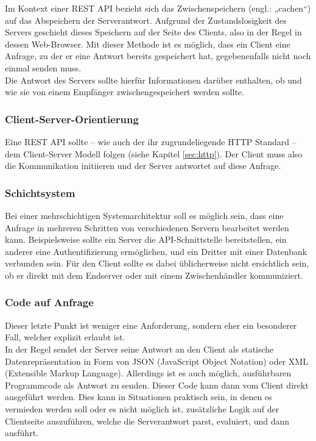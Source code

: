 Im Kontext einer REST API bezieht sich das Zwischenspeichern (engl.: „cachen“) auf das Abspeichern der Serverantwort. Aufgrund der Zustandslosigkeit des Servers geschieht dieses Speichern auf der Seite des Clients, also in der Regel in dessen Web-Browser. Mit dieser Methode ist es möglich, dass ein Client eine Anfrage, zu der er eine Antwort bereits gespeichert hat, gegebenenfalls nicht noch einmal senden muss.\\
Die Antwort des Servers sollte hierfür Informationen darüber enthalten, ob und wie sie von einem Empfänger zwischengespeichert werden sollte.

\subsubsection*{Client-Server-Orientierung}
\label{subsubsec:rest_clientserverorientierung}

Eine REST API sollte – wie auch der ihr zugrundeliegende HTTP Standard – dem Client-Server Modell folgen (siehe Kapitel \ref{sec:http}). Der Client muss also die Kommunikation initiieren und der Server antwortet auf diese Anfrage.

\subsubsection*{Schichtsystem}
\label{subsubsec:rest_schichtsystem}

Bei einer mehrschichtigen Systemarchitektur soll es möglich sein, dass eine Anfrage in mehreren Schritten von verschiedenen Servern bearbeitet werden kann. Beispielsweise sollte ein Server die API-Schnittstelle bereitstellen, ein anderer eine Authentifizierung ermöglichen, und ein Dritter mit einer Datenbank verbunden sein. Für den Client sollte es dabei üblicherweise nicht ersichtlich sein, ob er direkt mit dem Endserver oder mit einem Zwischenhändler kommuniziert.

\subsubsection*{Code auf Anfrage}
\label{subsubsec:rest_codeaufanfrage}

Dieser letzte Punkt ist weniger eine Anforderung, sondern eher ein besonderer Fall, welcher explizit erlaubt ist.\\
In der Regel sendet der Server seine Antwort an den Client als statische Datenrepräsentation in Form von JSON (JavaScript Object Notation) oder XML (Extensible Markup Language). Allerdings ist es auch möglich, ausführbaren Programmcode als Antwort zu senden. Dieser Code kann dann vom Client direkt ausgeführt werden. Dies kann in Situationen praktisch sein, in denen es vermieden werden soll oder es nicht möglich ist, zusätzliche Logik auf der Clientseite auszuführen, welche die Serverantwort parst, evaluiert, und dann ausführt.
